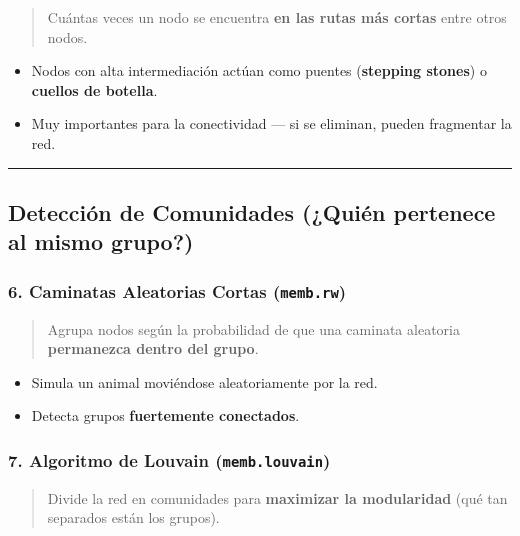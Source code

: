 \documentclass[
]{book}
\providecommand{\tightlist}{%
  \setlength{\itemsep}{0pt}\setlength{\parskip}{0pt}}
\begin{document}
\begin{quote}
Cuántas veces un nodo se encuentra \textbf{en las rutas más cortas} entre otros nodos.
\end{quote}

\begin{itemize}
\tightlist
\item
  Nodos con alta intermediación actúan como puentes (\textbf{stepping stones}) o \textbf{cuellos de botella}.
\item
  Muy importantes para la conectividad --- si se eliminan, pueden fragmentar la red.
\end{itemize}

\begin{center}\rule{0.5\linewidth}{0.5pt}\end{center}

\subsection{Detección de Comunidades (¿Quién pertenece al mismo grupo?)}\label{detecciuxf3n-de-comunidades-quiuxe9n-pertenece-al-mismo-grupo}

\subsubsection{\texorpdfstring{6. Caminatas Aleatorias Cortas (\texttt{memb.rw})}{6. Caminatas Aleatorias Cortas (memb.rw)}}\label{caminatas-aleatorias-cortas-memb.rw}

\begin{quote}
Agrupa nodos según la probabilidad de que una caminata aleatoria \textbf{permanezca dentro del grupo}.
\end{quote}

\begin{itemize}
\tightlist
\item
  Simula un animal moviéndose aleatoriamente por la red.
\item
  Detecta grupos \textbf{fuertemente conectados}.
\end{itemize}

\subsubsection{\texorpdfstring{7. Algoritmo de Louvain (\texttt{memb.louvain})}{7. Algoritmo de Louvain (memb.louvain)}}\label{algoritmo-de-louvain-memb.louvain}

\begin{quote}
Divide la red en comunidades para \textbf{maximizar la modularidad} (qué tan separados están los grupos).
\end{quote}
\end{document}
